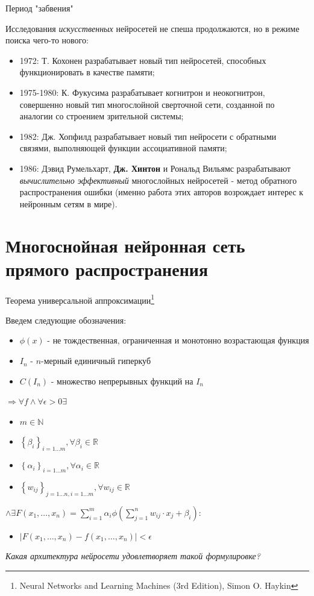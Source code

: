 \documentclass[10pt]{beamer}
\begin{document}
\begin{frame}{Период "забвения"}

Исследования \textit{искусственных} нейросетей не спеша продолжаются, но в режиме поиска чего-то нового:
\begin{itemize}
	\item 1972: Т. Кохонен разрабатывает новый тип нейросетей, способных функционировать в качестве памяти;
	\item 1975-1980: К. Фукусима разрабатывает когнитрон и неокогнитрон, совершенно новый тип многослойной сверточной сети, созданной по аналогии со строением зрительной системы;
	\item 1982: Дж. Хопфилд разрабатывает новый тип нейросети с обратными связями, выполняющей функции ассоциативной памяти;
	\item 1986: Дэвид Румельхарт, \textbf{Дж. Хинтон} и Рональд Вильямс разрабатывают \textit{вычислительно эффективный} многослойных нейросетей - метод обратного распространения ошибки (именно работа этих авторов возрождает интерес к нейронным сетям в мире).
\end{itemize}

\end{frame}


\section{Многоснойная нейронная сеть прямого распространения}

\begin{frame}{Теорема универсальной аппроксимации\footnote{Neural Networks and Learning Machines (3rd Edition), Simon O. Haykin}}

Введем следующие обозначения:
\begin{itemize}
	\item $\phi(x)$ - не тождественная, ограниченная и монотонно возрастающая функция
	\item $I_{n}$ - $n$-мерный единичный гиперкуб
	\item $C\left(I_{n}\right)$ - множество непрерывных функций на $I_{n}$
\end{itemize}
$\Rightarrow \forall f \wedge \forall \epsilon > 0 \exists$
\begin{itemize}
	\item $m \in \mathbb{N}$
	\item $\left\{\beta_i\right\}_{i=1\ldots m}, \forall \beta_i \in \mathbb{R}$
	\item $\left\{\alpha_i\right\}_{i=1\ldots m}, \forall \alpha_i \in \mathbb{R}$
	\item $\left\{w_{ij}\right\}_{j=1\ldots n, i=1\ldots m}, \forall w_{ij} \in \mathbb{R}$
\end{itemize}
$\wedge \exists F\left(x_1, \ldots, x_n\right) = \sum_{i=1}^m \alpha_i \phi \left( \sum_{j=1}^n w_{ij}\cdot x_j + \beta_i \right):$
\begin{itemize}
	\item $\left| F\left(x_1, \ldots, x_n\right) - f\left(x_1, \ldots, x_n\right) \right| < \epsilon$
\end{itemize}
\textit{Какая архитектура нейросети удовлетворяет такой формулировке?}
\end{frame}
\end{document}
